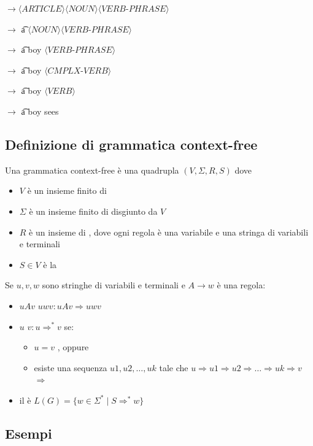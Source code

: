 $\rightarrow  \langle ARTICLE \rangle \langle NOUN\rangle \langle VERB$-$PHRASE \rangle$

$\rightarrow$ \t{a} $\langle NOUN\rangle\langle VERB$-$PHRASE\rangle$

$\rightarrow$ \t{a boy} $\langle VERB$-$PHRASE\rangle$

$\rightarrow$ \t{a boy} $\langle CMPLX$-$VERB\rangle$

$\rightarrow$ \t{a boy} $\langle VERB\rangle$

$\rightarrow$ \t{a boy sees}
			

\subsection{Definizione di grammatica context-free}
Una grammatica context-free è una quadrupla $(V,\Sigma,R,S)$ dove 
\begin{itemize}
	\item $V$ è un insieme finito di 
	\item $\Sigma$ è un insieme finito di  disgiunto da $V$ 
	\item $R$ è un insieme di , dove ogni regola è una variabile e una stringa di variabili e terminali 
	\item $S\in V$ è la 
\end{itemize}
Se $u, v , w$  sono stringhe di variabili e terminali e $A \rightarrow w$ è una regola:
\begin{itemize}
	\item $uAv$   $uwv : uAv \Rightarrow uwv$ 
	\item $u$  $v : u \Rightarrow^* v$ se:
		\begin{itemize}
			\item $u = v$  , oppure
			\item esiste una sequenza $u1, u2, \dots, uk$ tale che
				$u \Rightarrow u1 \Rightarrow u2 \Rightarrow \dots \Rightarrow uk \Rightarrow v$
				$\Rightarrow$ 
		\end{itemize}
	\item il  è $L(G) = \{w \in \Sigma^* \mid S \Rightarrow^* w \}$
\end{itemize}

\subsection{Esempi}
